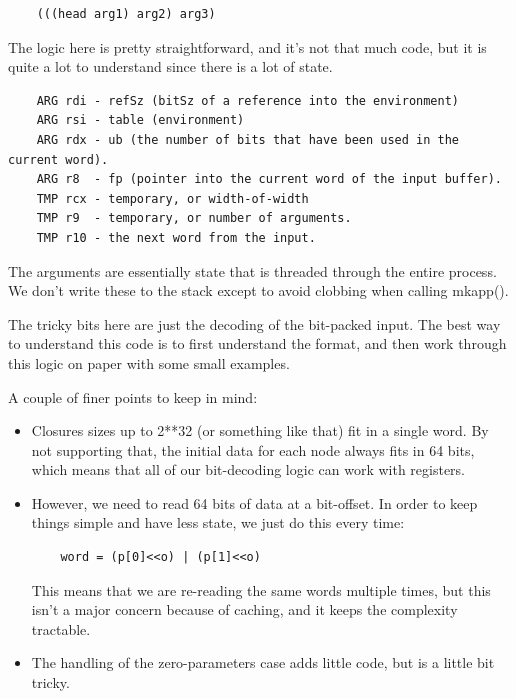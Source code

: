 \begin{verbatim}
    (((head arg1) arg2) arg3)
\end{verbatim}

The logic here is pretty straightforward, and it's not that much code,
but it is quite a lot to understand since there is a lot of state.

\begin{verbatim}
    ARG rdi - refSz (bitSz of a reference into the environment)
    ARG rsi - table (environment)
    ARG rdx - ub (the number of bits that have been used in the current word).
    ARG r8  - fp (pointer into the current word of the input buffer).
    TMP rcx - temporary, or width-of-width
    TMP r9  - temporary, or number of arguments.
    TMP r10 - the next word from the input.
\end{verbatim}

The arguments are essentially state that is threaded through the entire
process. We don't write these to the stack except to avoid clobbing when
calling mkapp().

The tricky bits here are just the decoding of the bit-packed input.
The best way to understand this code is to first understand the format,
and then work through this logic on paper with some small examples.

A couple of finer points to keep in mind:

\begin{itemize}
\item
    Closures sizes up to 2**32 (or something like that) fit in a single
    word.  By not supporting that, the initial data for each node always
    fits in 64 bits, which means that all of our bit-decoding logic can
    work with registers.
\item
    However, we need to read 64 bits of data at a bit-offset.  In order
    to keep things simple and have less state, we just do this every time:

\begin{verbatim}
    word = (p[0]<<o) | (p[1]<<o)
\end{verbatim}

    This means that we are re-reading the same words multiple times,
    but this isn't a major concern because of caching, and it keeps the
    complexity tractable.
\item
    The handling of the zero-parameters case adds little code, but is
    a little bit tricky.
\end{itemize}

